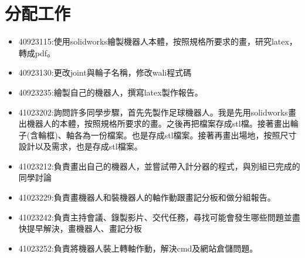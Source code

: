 \chapter{分配工作}
\begin{itemize}
\item 40923115:使用solidworks繪製機器人本體，按照規格所要求的畫，研究latex，轉成pdf。
\item 40923130:更改joint與輪子名稱，修改wali程式碼 
\item 40923235:繪製自己的機器人，撰寫latex製作報告。
\item 41023202:詢問許多同學步驟，首先先製作足球機器人。我是先用solidworks畫出機器人的本體，按照規格所要求的畫。之後再把檔案存成stl檔。接著畫出輪子(含輪框)、軸各為一份檔案。也是存成stl檔案。接著再畫出場地，按照尺寸設計以及需求，也是存成stl檔案。 
\item 41023212:負責畫出自己的機器人，並嘗試帶入計分器的程式，與別組已完成的同學討論 
\item 41023229:負責畫機器人和裝機器人的軸作動跟畫記分板和做分組報告。 
\item 41023242:負責主持會議、錄製影片、交代任務，尋找可能會發生哪些問題並盡快提早解決，畫機器人、畫記分板 
\item 41023252:負責將機器人裝上轉軸作動，解決cmd及網站倉儲問題。 
\end{itemize}
\newpage
